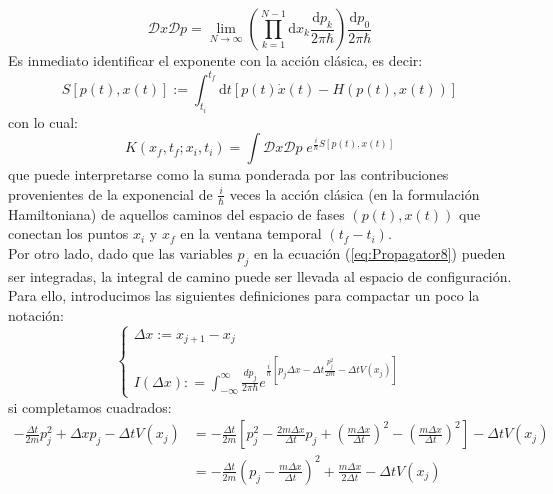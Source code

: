 \documentclass[11pt,a4paper]{article}
\begin{document}
\begin{equation}
\mathcal{D}x\mathcal{D}p = \lim_{N \rightarrow \infty}\left( \prod_{k=1}^{N-1}\mathrm{d}x_k\frac{\mathrm{d}p_k}{2\pi\hbar} \right)\frac{\mathrm{d}p_0}{2\pi\hbar}
\label{eq:measure}
\end{equation}
Es inmediato identificar el exponente con la acci\'on cl\'asica, es decir:
\begin{equation}
S\left[ p(t), x(t) \right] := \int_{t_i}^{t_f}\mathrm{d}t\left[ p(t)\dot{x}(t) - H(p(t),x(t)) \right] 
\label{eq:action}
\end{equation}
con lo cual:
\begin{equation}
K(x_f,t_f; x_i,t_i) = \int\mathcal{D}x\mathcal{D}p \; e^{\frac{i}{\hbar}S\left[ p(t), x(t) \right]}
\label{eq:Propagator9}
\end{equation}
que puede interpretarse como la suma ponderada por las contribuciones provenientes de la exponencial de $\frac{i}{\hbar}$ veces la acci\'on cl\'asica (en la formulaci\'on Hamiltoniana) de aquellos caminos del espacio de fases $(p(t),x(t))$ que conectan los puntos $x_i$ y $x_f$ en la ventana temporal $(t_f - t_i)$.\\
Por otro lado, dado que las variables $p_j$ en la ecuaci\'on (\ref{eq:Propagator8}) pueden ser integradas, la integral de camino puede ser llevada al espacio de configuraci\'on. Para ello, introducimos las siguientes definiciones para compactar un poco la notaci\'on:
\begin{equation}
\left\{
\begin{array}{l}
\Delta x := x_{j+1} - x_j \\ \\
I(\Delta x) : = \int_{-\infty}^{\infty} \frac{dp_j}{2\pi\hbar} e^{\frac{i}{\hbar}\left[ p_j \Delta x - \Delta t \frac{p_j^2}{2m} - \Delta t V(x_j) \right]}
\end{array} 
\right.
\label{eq:definitions}
\end{equation}
si completamos cuadrados:
\begin{equation}
\begin{split}
- \frac{\Delta t}{2m} p_j^2 + \Delta x p_j - \Delta t V(x_j) & = - \frac{\Delta t}{2m} \left[ p_j^2 - \frac{2m\Delta x}{\Delta t} p_j + \left( \frac{m\Delta x}{\Delta t} \right)^2 - \left( \frac{m\Delta x}{\Delta t} \right)^2 \right] - \Delta t V(x_j) \\
&  = - \frac{\Delta t}{2m} \left( p_j - \frac{m \Delta x}{\Delta t} \right)^2 + \frac{m\Delta x}{2 \Delta t} - \Delta t V(x_j)
\end{split}
\label{eq:completingthesquare}
\end{equation}
\end{document}
